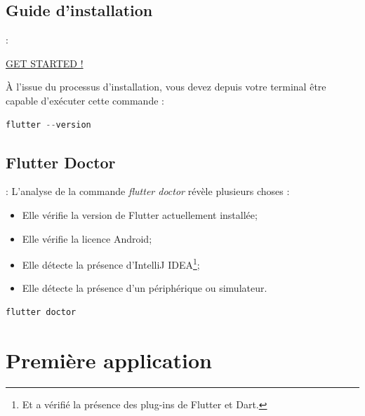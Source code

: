 \documentclass[10pt]{beamer}
\begin{document}
\subsection{Guide d'installation}
\begin{frame}[fragile,t]{\secname : \subsecname}
    \begin{center}
        \href{https://flutter.dev/docs/get-started/install}{GET STARTED !}
    \end{center}
    À l'issue du processus d'installation, vous devez depuis votre terminal être capable d’exécuter cette commande :
    \begin{lstlisting}[caption={Connaître la version de flutter},language=C, label=getversion]
    flutter --version
    \end{lstlisting}
\end{frame}

\subsection{Flutter Doctor}
\begin{frame}[fragile,t]{\secname : \subsecname}
    L’analyse de la commande \textit{flutter doctor} révèle plusieurs choses :
    \begin{itemize}
        \item Elle vérifie la version de Flutter actuellement installée;
        \item Elle vérifie la licence Android;
        \item Elle détecte la présence d’IntelliJ IDEA\footnote{Et a vérifié la présence des plug-ins de Flutter  et Dart.};
        \item Elle détecte la présence d'un périphérique ou simulateur.
    \end{itemize}
    \begin{lstlisting}[caption={Vérifier l'installation},language=bash, label=getversion]
        flutter doctor
        \end{lstlisting}
\end{frame}

\section{Première application}
\end{document}
